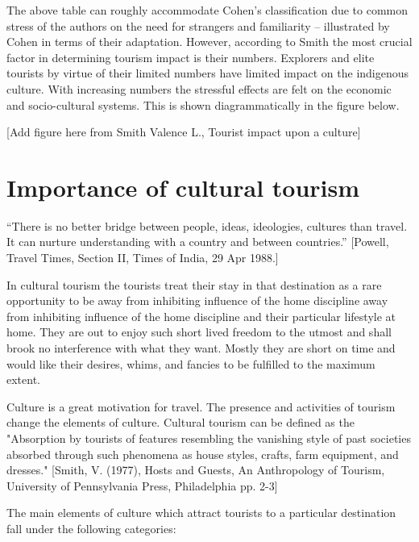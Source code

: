 
\noindent The above table can roughly accommodate Cohen's classification due to common stress of the authors on the need for strangers and familiarity -- illustrated by Cohen in terms of their adaptation. However, according to Smith the most crucial factor in determining tourism impact is their numbers. Explorers and elite tourists by virtue of their limited numbers have limited impact on the indigenous culture. With increasing numbers the stressful effects are felt on the economic and socio-cultural systems. This is shown diagrammatically in the figure below.

[Add figure here from Smith Valence L., Tourist impact upon a culture]



\section{Importance of cultural tourism} %
\label{sec:imct}

``There is no better bridge between people, ideas, ideologies, cultures than travel. It can nurture understanding with a country and between countries.'' [Powell, Travel Times, Section II, Times of India, 29 Apr 1988.]

In cultural tourism the tourists treat their stay in that destination as a rare opportunity to be away from inhibiting influence of the home discipline away from inhibiting influence of the home discipline and their particular lifestyle at home. They are out to enjoy such short lived freedom to the utmost and shall brook no interference with what they want. Mostly they are short on time and would like their desires, whims, and fancies to be fulfilled to the maximum extent.

Culture is a great motivation for travel. The presence and activities of tourism change the elements of culture. Cultural tourism can be defined as the "Absorption by tourists of features resembling the vanishing style of past societies absorbed through such phenomena as house styles, crafts, farm equipment, and dresses." [Smith, V. (1977), Hosts and Guests, An Anthropology of Tourism, University of Pennsylvania Press, Philadelphia pp. 2-3]

The main elements of culture which attract tourists to a particular destination fall under the following categories:


